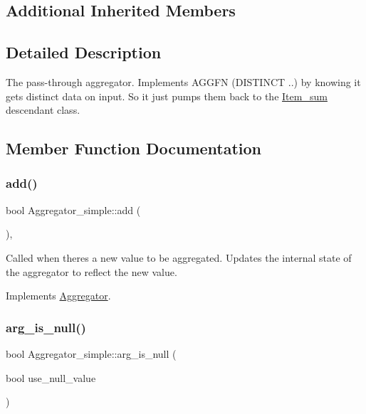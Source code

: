 \subsection*{Additional Inherited Members}


\subsection{Detailed Description}
The pass-\/through aggregator. Implements A\+G\+G\+FN (D\+I\+S\+T\+I\+N\+CT ..) by knowing it gets distinct data on input. So it just pumps them back to the \mbox{\hyperlink{classItem__sum}{Item\+\_\+sum}} descendant class. 

\subsection{Member Function Documentation}
\mbox{\label{classAggregator__simple_aa3b0160d86a60634bd390596bd524c7a}} 
\subsubsection{\texorpdfstring{add()}{add()}}
{\footnotesize\ttfamily bool Aggregator\+\_\+simple\+::add (\begin{DoxyParamCaption}{ }\end{DoxyParamCaption})\hspace{0.3cm}{\ttfamily [inline]}, {\ttfamily [virtual]}}

Called when there\textquotesingle{}s a new value to be aggregated. Updates the internal state of the aggregator to reflect the new value. 

Implements \mbox{\hyperlink{classAggregator_a70e0d53834f2672f3ec57c96e35a9a60}{Aggregator}}.

\mbox{\label{classAggregator__simple_a89edab7b2334ef55dd1848094cdb4331}} 
\subsubsection{\texorpdfstring{arg\+\_\+is\+\_\+null()}{arg\_is\_null()}}
{\footnotesize\ttfamily bool Aggregator\+\_\+simple\+::arg\+\_\+is\+\_\+null (\begin{DoxyParamCaption}\item[{bool}]{use\+\_\+null\+\_\+value }\end{DoxyParamCaption})\hspace{0.3cm}{\ttfamily [virtual]}}

